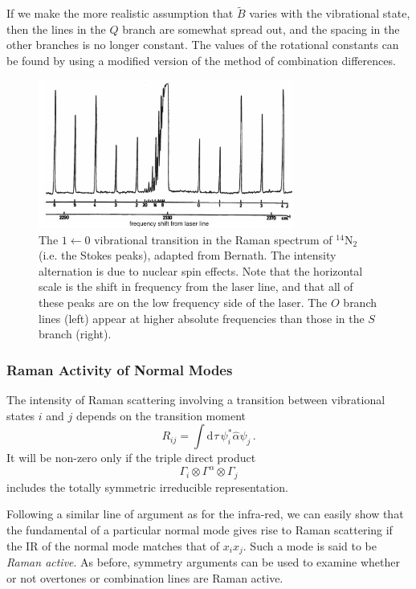 \documentclass{article}
\theoremstyle{plain}\theoremheaderfont{\normalfont\itshape}\theorembodyfont{\rmfamily}\theoremseparator{.}\newtheorem*{rem}{Remark}\newtheorem*{ex}{Example}\newtheorem*{proof}{Proof}\newtheorem*{altp}{Alternative proof}
\theoremstyle{plain}\theoremheaderfont{\normalfont\bfseries}\theorembodyfont{\rmfamily}\theoremseparator{.}\newtheorem{thm}{Theorem}[section]\newtheorem{lem}[thm]{Lemma}\newtheorem{prop}[thm]{Proposition}\newtheorem*{cor}{Corollary}\newtheorem{defn}[thm]{Definition}\newtheorem{clm}[thm]{Claim}\newtheorem{clminproof}{Claim}\newtheorem{pos}{Postulate}[section]
\theoremstyle{break}\theoremheaderfont{\normalfont\itshape}\theorembodyfont{\rmfamily}\theoremseparator{.\medskip}\newtheorem*{proofskip}{Proof}\newtheorem*{exs}{Examples}\newtheorem*{rems}{Remarks}
\theoremstyle{break}\theoremheaderfont{\normalfont\bfseries}\theorembodyfont{\rmfamily}\theoremseparator{.\medskip}\newtheorem{lemskip}[thm]{Lemma}\newtheorem{defnskip}[thm]{Definition}\newtheorem{propskip}[thm]{Proposition}\newtheorem{thmskip}[thm]{Theorem}
\numberwithin{equation}{section}
\newcommand{\dd}[2][]{\mathrm{d}^{#1} #2\,}
\begin{document}
    If we make the more realistic assumption that \(\tilde{B}\) varies with the vibrational state, then the lines in the \(Q\) branch are somewhat spread out, and the spacing in the other branches is no longer constant.  The values of the rotational constants can be found by using a modified version of the method of combination differences.

    \begin{figure}
        \centering
        \includegraphics[width=0.75\textwidth]{vibrot_raman.png}
        \caption{The \(1\leftarrow 0\) vibrational transition in the Raman spectrum of \(\mathrm{^{14}N_2}\) (i.e. the Stokes peaks), adapted from Bernath. The intensity alternation is due to nuclear spin effects. Note that the horizontal scale is the shift in frequency from the laser line, and that all of these peaks are on the low frequency side of the laser. The \(O\) branch lines (left) appear at higher absolute frequencies than those in the \(S\) branch (right).}
    \end{figure}
    \subsubsection{Raman Activity of Normal Modes}
    The intensity of Raman scattering involving a transition between vibrational states \(i\) and \(j\) depends on the transition moment
    \begin{equation}
        R_{ij}=\int\dd{\tau}\psi_i^*\hat{\alpha}\psi_j\,.
    \end{equation}
    It will be non-zero only if the triple direct product
    \begin{equation}
        \Gamma_i\otimes\Gamma^\alpha\otimes\Gamma_j
    \end{equation}
    includes the totally symmetric irreducible representation.

    Following a similar line of argument as for the infra-red, we can easily show that the fundamental of a particular normal mode gives rise to Raman scattering if the IR of the normal mode matches that of \(x_ix_j\). Such a mode is said to be \textit{Raman active}. As before, symmetry arguments can be used to examine whether or not overtones or combination lines are Raman active.
\end{document}
